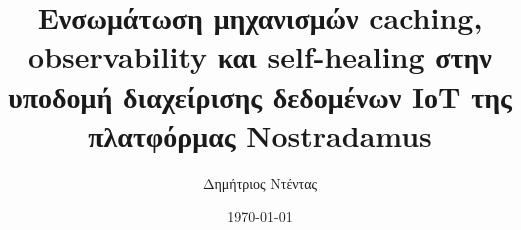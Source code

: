 \documentclass[a4paper,12 pt,oneside]{report}
\title{Ενσωμάτωση μηχανισμών caching,
observability και self-healing στην υποδομή διαχείρισης
δεδομένων ΙοΤ της πλατφόρμας Nostradamus}
\author{Δημήτριος Ντέντας}
\date{\today}
\begin{document}
\sloppy

\maketitle
\tableofcontents

% 

\newevenside
{}





\newevenside
\renewcommand{\bibname}{Βιβλιογραφία}

\end{document}
